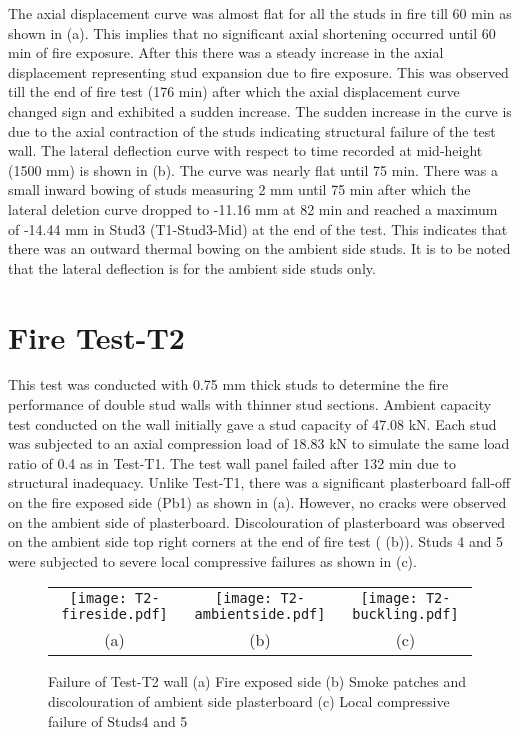 The axial displacement curve was almost flat for all the studs in fire till 60 min as shown in  (a). This implies that no significant axial shortening occurred until 60 min of fire exposure. After this there was a steady increase in the axial displacement representing stud expansion due to fire exposure. This was observed till the end of fire test (176 min) after which the axial displacement curve changed sign and exhibited a sudden increase. The sudden increase in the curve is due to the axial contraction of the studs indicating structural failure of the test wall. The lateral deflection curve with respect to time recorded at mid-height (1500 mm) is shown in  (b). The curve was nearly flat until 75 min. There was a small inward bowing of studs measuring 2 mm until 75 min after which the lateral deletion curve dropped to -11.16 mm at 82 min and reached a maximum of -14.44 mm in Stud3 (T1-Stud3-Mid) at the end of the test. This indicates that there was an outward thermal bowing on the ambient side studs. It is to be noted that the lateral deflection is for the ambient side studs only.

\section{Fire Test-T2}\label{sec:t2-fire-test}

This test was conducted with 0.75 mm thick studs to determine the fire performance of double stud walls with thinner stud sections. Ambient capacity test conducted on the wall initially gave a stud capacity of 47.08 kN. Each stud was subjected to an axial compression load of 18.83 kN to simulate the same load ratio of 0.4 as in Test-T1. The test wall panel failed after 132 min due to structural inadequacy. Unlike Test-T1, there was a significant plasterboard fall-off on the fire exposed side (Pb1) as shown in  (a). However, no cracks were observed on the ambient side of plasterboard. Discolouration of plasterboard was observed on the ambient side top right corners at the end of fire test ( (b)). Studs 4 and 5 were subjected to severe local compressive failures as shown in  (c).
\begin{figure}[!htbp]
	\centering
		\begin{tabular}{ccc}
			\texttt{[image: T2-fireside.pdf]} & 
			\texttt{[image: T2-ambientside.pdf]} &
			\texttt{[image: T2-buckling.pdf]} \\	 
			(a) & (b) & (c)  \\ 
		\end{tabular} 
		\caption{Failure of Test-T2 wall (a) Fire exposed side (b) Smoke patches and discolouration of ambient side plasterboard (c) Local compressive failure of Studs4 and 5}
		\label{fig:T2-failure}
\end{figure}


